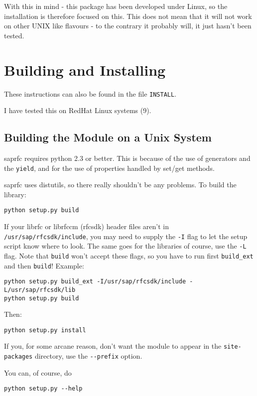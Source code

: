 \documentclass{howto}
\begin{document}
With this in mind - this package has been developed under Linux, so the installation is therefore focused on this.  This does not mean that it will not work on other UNIX like flavours - to the contrary it probably will, it just hasn't been tested.


\section{Building and Installing \label{building}}

These instructions can also be found in the file \verb|INSTALL|.

I have tested this on RedHat Linux systems (9).

\subsection{Building the Module on a Unix System \label{building-unix}}

saprfc requires python 2.3 or better.  This is because of the use of generators and 
the \verb|yield|, and for the use of properties handled by set/get methods.

saprfc uses distutils, so there really shouldn't be any problems. To build
the library:
\begin{verbatim}
python setup.py build
\end{verbatim}

If your librfc or librfccm (rfcsdk) header files aren't in \verb|/usr/sap/rfcsdk/include|, you 
may need to supply the \verb|-I| flag to let the setup script know where to look. 
The same goes for the libraries of course, use the \verb|-L| flag. Note that
\verb|build| won't accept these flags, so you have to run first
\verb|build_ext| and then \verb|build|! Example:
\begin{verbatim}
python setup.py build_ext -I/usr/sap/rfcsdk/include -L/usr/sap/rfcsdk/lib
python setup.py build
\end{verbatim}

Then:

\begin{verbatim}
python setup.py install
\end{verbatim}

If you, for some arcane reason, don't want the module to appear in the
\verb|site-packages| directory, use the \verb|--prefix| option.

You can, of course, do
\begin{verbatim}
python setup.py --help
\end{verbatim}
\end{document}
